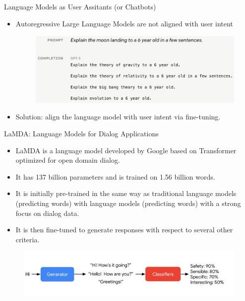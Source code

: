 \documentclass[handout]{beamer}
\begin{document}
\begin{frame}{Language Models as User Assitants (or Chatbots)}

\begin{scriptsize}
\begin{itemize}
\item Autoregressive Large Language Models are not aligned with user intent \cite{ouyang2022training}


 \begin{figure}[h]
        	\includegraphics[scale = 0.34]{pics/lmnotuserassistant.png}
        \end{figure}

\item Solution: align the language model with user intent via fine-tuning.


\end{itemize}
\end{scriptsize}





\end{frame}


\begin{frame}{LaMDA: Language Models for Dialog Applications}

\begin{scriptsize}
\begin{itemize}
\item LaMDA is a language model developed by Google based on Transformer optimized for open domain dialog.
\item It has 137 billion parameters and is trained on 1.56 billion words.
\item It is initially pre-trained in the same way as traditional language models (predicting words) with language models (predicting words) with a strong focus on dialog data.
\item It is then ﬁne-tuned to generate responses with respect to several other criteria.
\end{itemize}
\end{scriptsize}

 \begin{figure}[h]
        	\includegraphics[scale = 0.5]{pics/lambda.png}
        \end{figure}



\end{frame}
\end{document}
